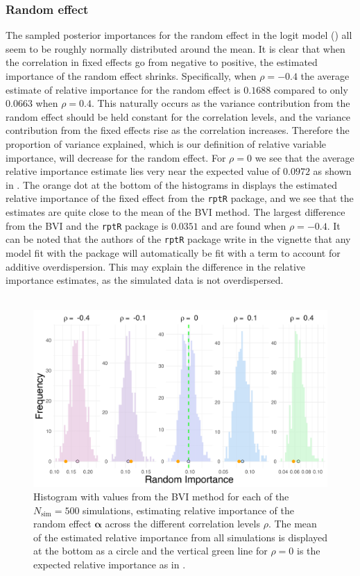 \subsubsection{Random effect}
The sampled posterior importances for the random effect in the logit model () all seem to be roughly normally distributed around the mean. It is clear that when the correlation in fixed effects go from negative to positive, the estimated importance of the random effect shrinks. Specifically, when $\rho=-0.4$ the average estimate of relative importance for the random effect is $0.1688$ compared to only $0.0663$ when $\rho=0.4$. This naturally occurs as the variance contribution from the random effect should be held constant for the correlation levels, and the variance contribution from the fixed effects rise as the correlation increases. Therefore the proportion of variance explained, which is our definition of relative variable importance, will decrease for the random effect. For $\rho=0$ we see that the average relative importance estimate lies very near the expected value of $0.0972$ as shown in . The orange dot at the bottom of the histograms in  displays the estimated relative importance of the fixed effect from the \texttt{rptR} package, and we see that the estimates are quite close to the mean of the BVI method. The largest difference from the BVI and the \texttt{rptR} package is $0.0351$ and are found when $\rho=-0.4$. It can be noted that the authors of the \texttt{rptR} package \citep{Stoffel2017rptR} write in the vignette that any model fit with the package will automatically be fit with a term to account for additive overdispersion. This may explain the difference in the relative importance estimates, as the simulated data is not overdispersed.
\\
\\
\begin{figure}[H]
  \centering
    \includegraphics[width=1\linewidth]{Figures/Simulation study/Random_logit.png}
    \caption{Histogram with values from the BVI method for each of the $N_{\text{sim}}=500$ simulations, estimating relative importance of the random effect $\boldsymbol{\alpha}$ across the different correlation levels $\rho$. The mean of the estimated relative importance from all simulations is displayed at the bottom as a circle and the vertical green line for $\rho=0$ is the expected relative importance as in .}
    \label{fig:relimp_random_logit}
\end{figure}
